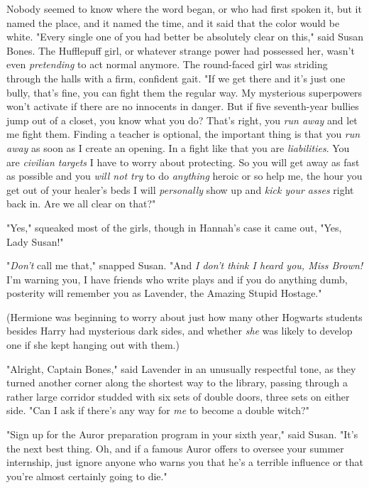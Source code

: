 Nobody seemed to know where the word began, or who had first spoken it, but it 
named the place, and it named the time, and it said that the color would be 
white.
\sbreak
"Every single one of you had better be absolutely clear on this," said Susan 
Bones. The Hufflepuff girl, or whatever strange power had possessed her, wasn't 
even \emph{pretending} to act normal anymore. The round-faced girl was striding 
through the halls with a firm, confident gait. "If we get there and it's just 
one bully, that's fine, you can fight them the regular way. My mysterious 
superpowers won't activate if there are no innocents in danger. But if five 
seventh-year bullies jump out of a closet, you know what you do? That's right, 
you \emph{run away} and let me fight them. Finding a teacher is optional, the 
important thing is that you \emph{run away} as soon as I create an opening. In 
a fight like that you are \emph{liabilities}. You are \emph{civilian targets} I 
have to worry about protecting. So you will get away as fast as possible and 
you \emph{will not try} to do \emph{anything} heroic or so help me, the hour 
you get out of your healer's beds I will \emph{personally} show up and 
\emph{kick your asses} right back in. Are we all clear on that?"

"Yes," squeaked most of the girls, though in Hannah's case it came out, "Yes, 
Lady Susan!"

"\emph{Don't} call me that," snapped Susan. "And \emph{I don't think I heard 
you, Miss Brown!} I'm warning you, I have friends who write plays and if you do 
anything dumb, posterity will remember you as Lavender, the Amazing Stupid 
Hostage."

(Hermione was beginning to worry about just how many other Hogwarts students 
besides Harry had mysterious dark sides, and whether \emph{she} was likely to 
develop one if she kept hanging out with them.)

"Alright, Captain Bones," said Lavender in an unusually respectful tone, as 
they turned another corner along the shortest way to the library, passing 
through a rather large corridor studded with six sets of double doors, three 
sets on either side. "Can I ask if there's any way for \emph{me} to become a 
double witch?"

"Sign up for the Auror preparation program in your sixth year," said Susan. 
"It's the next best thing. Oh, and if a famous Auror offers to oversee your 
summer internship, just ignore anyone who warns you that he's a terrible 
influence or that you're almost certainly going to die."

